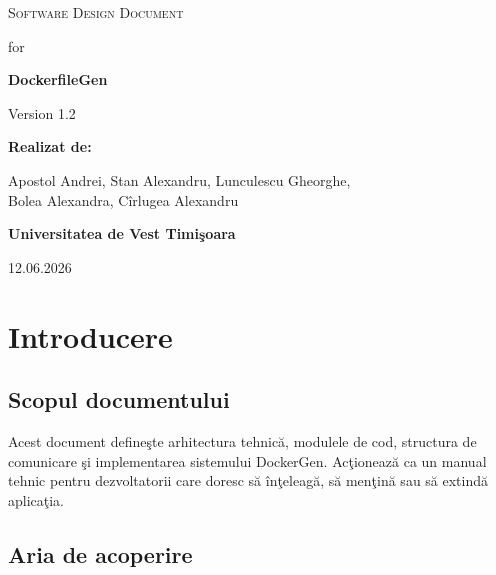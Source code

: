 \documentclass[12pt, a4paper]{article}
\begin{document}
\begin{titlepage}
    \centering
    \vspace*{1cm}
    {\scshape\LARGE Software Design Document\par}
    \vspace{0.5cm}
    {\large for\par}
    \vspace{0.5cm}
    {\Huge\bfseries DockerfileGen\par}
    \vspace{1.5cm}
    {\Large Version 1.2\par}
    \vspace{1cm}
    {\bfseries Realizat de:\par}
    Apostol Andrei, Stan Alexandru, Lunculescu Gheorghe,\\
    Bolea Alexandra, C\^{i}rlugea Alexandru\par
    \vspace{1cm}
    {\bfseries Universitatea de Vest Timi\c{s}oara\par}
    \vspace{0.5cm}
    {\large 12.06.2026\par}
\end{titlepage}

\tableofcontents
\newpage

\section{Introducere}

\subsection{Scopul documentului}

Acest document define\c{s}te arhitectura tehnic\u{a}, modulele de cod, structura de comunicare \c{s}i
implementarea sistemului DockerGen. Ac\c{t}ioneaz\u{a} ca un manual tehnic pentru dezvoltatorii care
doresc s\u{a} \^{i}n\c{t}eleag\u{a}, s\u{a} men\c{t}in\u{a} sau s\u{a} extind\u{a} aplica\c{t}ia.

\subsection{Aria de acoperire}
\end{document}
